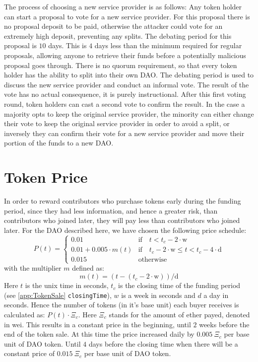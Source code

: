 \documentclass[9pt,oneside]{amsart}
\begin{document}
\begin{multicols}{2}
The process of choosing a new service provider is as follows:
Any token holder can start a proposal to vote for a new service provider. For this proposal there is no proposal deposit to be paid, otherwise the attacker could vote for an extremely high deposit, preventing any splits. The debating period for this proposal is $10$ days.
This is $4$ days less than the minimum required for regular proposals, allowing anyone to retrieve their funds before a potentially malicious proposal goes through. There is no quorum requirement, so that every token holder has the ability to split into their own DAO. 
The debating period is used to discuss the new service provider and conduct an informal vote. The result of the vote has no actual consequence, it is purely instructional. After this first voting round, token holders can cast a second vote to confirm the result. In the case a majority opts to  keep the original service provider, the minority can either change their vote to keep the original service provider in order to avoid a split, or inversely they can confirm their vote for a new service provider and move their portion of the funds to a new DAO.

\section{Token Price} \label{TokenPrice}
In order to reward contributors who purchase tokens early during the funding period, since they had less information, and hence a greater risk, than contributors who joined later, they will pay less than contributors who joined later.
For the DAO described here, we have chosen the following price schedule:
\begin{equation}
 P(t) = \begin{cases}
0.01 & \text{if} \quad t < t_c - 2 \cdot \text{w} \\
0.01 + 0.005 \cdot m(t) & \text{if} \quad t_c - 2 \cdot \text{w} \leqslant t < t_c - 4 \cdot \text{d} \\
0.015 & \text{otherwise}
\end{cases}
\end{equation}
with the multiplier $m$ defined as:
\begin{equation}
 m(t) = (t - (t_c - 2 \cdot \text{w})) / \text{d}
\end{equation}
Here $t$ is the unix time in seconds, $t_c$ is the closing time of the funding period (see \ref{app:TokenSale} \verb|closingTime|), $w$ is a week in seconds and $d$ a day in seconds.
Hence the number of tokens (in it’s base unit) each buyer receives is calculated as: $P(t) \cdot \Xi_c$. Here $\Xi_c$ stands for the amount of ether payed, denoted in wei.
This results in a constant price in the beginning, until $2$ weeks before the end of the token sale. At this time the price increased daily by $0.005 \: \Xi_c$ per base unit of DAO token. Until $4$ days before the closing time when there will be a constant price of $0.015 \: \Xi_c$ per base unit of DAO token.


\end{multicols}
\end{document}
